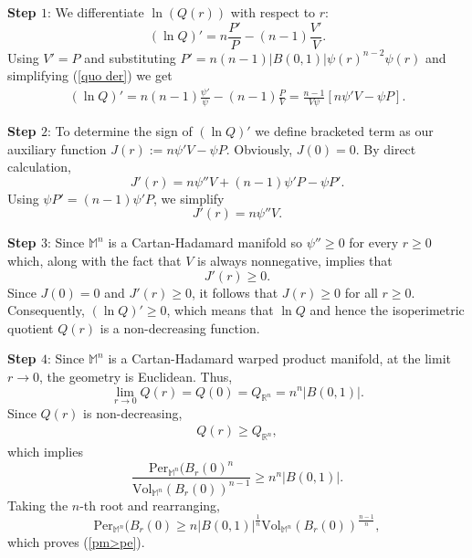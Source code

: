 \documentclass[a4paper,11pt,reqno]{amsart}
\renewcommand\eqref[1]{(\ref{#1})}
\theoremstyle{plain}
\numberwithin{equation}{section} \allowdisplaybreaks
\newcommand{\m}{\mathbb{M}^n}
\newcommand{\rn}{\mathbb{R}^n}
\begin{document}
\textbf{Step $1$}: We differentiate $\ln(Q(r))$ with respect to $r$:
\begin{equation}\label{quo der}
    (\ln Q)'=n\frac{P'}{P}-(n-1)\frac{V'}{V}.
\end{equation}
Using $V'=P$ and substituting $P'= n(n-1)|B(0,1)|\psi(r)^{n-2}\psi(r)$ and simplifying \eqref{quo der} we get
\begin{align}
    (\ln Q)'= n(n-1)\frac{\psi'}{\psi}-(n-1)\frac{P}{V}
    = \frac{n-1}{V\psi}\left[n\psi'V-\psi P\right].
\end{align}

\textbf{Step $2$}: To determine the sign of $(\ln Q)'$ we define bracketed term as our auxiliary function $J(r):= n\psi'V-\psi P$. Obviously, $J(0)=0$. By direct calculation,
\begin{equation*}
    J'(r)= n\psi''V+(n-1)\psi'P-\psi P'.
\end{equation*}
Using $ \psi P'=(n-1)\psi' P$, we simplify
\begin{equation*}
    J'(r)= n\psi''V.
\end{equation*}

\textbf{Step $3$}: Since $\m$ is a Cartan-Hadamard manifold so $\psi'' \geq 0$ for every $r \geq 0$ which, along with the fact that $V$ is always nonnegative, implies that \begin{equation*}
    J'(r) \geq 0.
\end{equation*}
Since $J(0)=0$ and $J'(r) \geq 0$, it follows that $J(r) \geq 0$ for all $r \geq 0$. Consequently, $(\ln Q)' \geq 0$, which means that $\ln Q$ and hence the isoperimetric quotient $Q(r)$ is a non-decreasing function.

\textbf{Step $4$}: Since $\m$ is a Cartan-Hadamard warped product manifold, at the limit $r \to 0$, the geometry is Euclidean. Thus,
\begin{equation*}
    \lim_{r \to 0} Q(r) =Q(0)=Q_{\rn}=n^n|B(0,1)|.
\end{equation*}
Since $Q(r)$ is non-decreasing,
\begin{align*}
    Q(r) \geq Q_{\rn},
\end{align*}
which implies
\begin{equation*}
    \frac{\text{Per}_{\m}(B_r(0)^n}{\text{Vol}_{\m}(B_r(0))^{n-1}} \geq n^n |B(0,1)|.
\end{equation*}
Taking the $n$-th root and rearranging,
\begin{equation*}
    \text{Per}_{\m}(B_r(0) \geq n|B(0,1)|^{\frac{1}{n}}\text{Vol}_{\m}(B_r(0))^{\frac{n-1}{n}},
\end{equation*}
which proves \eqref{pm>pe}.
\end{document}
